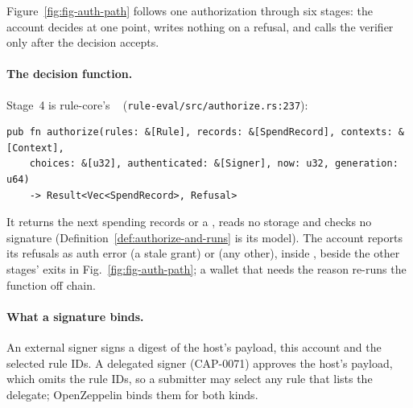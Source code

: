 Figure~\ref{fig:fig-auth-path} follows one authorization through six stages:
the account decides at one point, writes nothing on a refusal, and calls the
verifier only after the decision accepts.


\paragraph{The decision function.} Stage~4 is rule-core's
~
(\nolinkurl{rule-eval/src/authorize.rs:237}):
\begin{Verbatim}[fontsize=\scriptsize,xleftmargin=1em]
pub fn authorize(rules: &[Rule], records: &[SpendRecord], contexts: &[Context],
    choices: &[u32], authenticated: &[Signer], now: u32, generation: u64)
    -> Result<Vec<SpendRecord>, Refusal>
\end{Verbatim}
It returns the next spending records or a , reads no storage and
checks no signature (Definition~\ref{def:authorize-and-runs} is its model). The
account reports its refusals as auth error  (a
stale grant) or  (any other), inside
, beside the other stages' exits in
Fig.~\ref{fig:fig-auth-path}; a wallet that needs the reason re-runs the
function off chain.

\paragraph{What a signature binds.} An external signer signs a digest of the
host's payload, this account and the selected rule IDs. A delegated signer
(CAP-0071) approves the host's payload, which omits the rule IDs, so a submitter
may select any rule that lists the delegate; OpenZeppelin 
binds them for both kinds.
